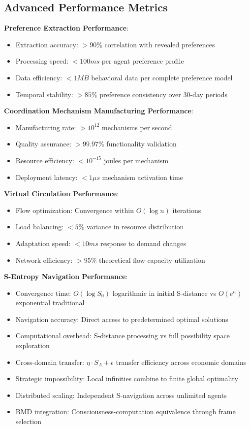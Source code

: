 \documentclass[12pt,a4paper]{article}
\begin{document}
\subsection{Advanced Performance Metrics}

\textbf{Preference Extraction Performance}:
\begin{itemize}
\item Extraction accuracy: $> 90\%$ correlation with revealed preferences
\item Processing speed: $< 100ms$ per agent preference profile
\item Data efficiency: $< 1MB$ behavioral data per complete preference model
\item Temporal stability: $> 85\%$ preference consistency over 30-day periods
\end{itemize}

\textbf{Coordination Mechanism Manufacturing Performance}:
\begin{itemize}
\item Manufacturing rate: $> 10^{12}$ mechanisms per second
\item Quality assurance: $> 99.97\%$ functionality validation
\item Resource efficiency: $< 10^{-15}$ joules per mechanism
\item Deployment latency: $< 1\mu s$ mechanism activation time
\end{itemize}

\textbf{Virtual Circulation Performance}:
\begin{itemize}
\item Flow optimization: Convergence within $O(\log n)$ iterations
\item Load balancing: $< 5\%$ variance in resource distribution
\item Adaptation speed: $< 10ms$ response to demand changes
\item Network efficiency: $> 95\%$ theoretical flow capacity utilization
\end{itemize}

\textbf{S-Entropy Navigation Performance}:
\begin{itemize}
\item Convergence time: $O(\log S_0)$ logarithmic in initial S-distance vs $O(e^n)$ exponential traditional
\item Navigation accuracy: Direct access to predetermined optimal solutions
\item Computational overhead: S-distance processing vs full possibility space exploration
\item Cross-domain transfer: $\eta \cdot S_A + \epsilon$ transfer efficiency across economic domains
\item Strategic impossibility: Local infinities combine to finite global optimality
\item Distributed scaling: Independent S-navigation across unlimited agents
\item BMD integration: Consciousness-computation equivalence through frame selection
\end{itemize}
\end{document}
